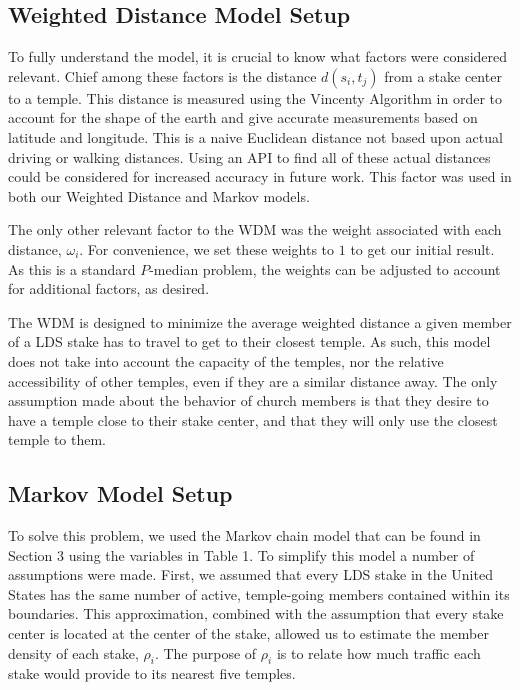 \documentclass[twoside,twocolumn]{article}
\begin{document}
\subsection{Weighted Distance Model Setup}

To fully understand the model, it is crucial to know what factors were considered relevant.
Chief among these factors is the distance $d(s_i,t_j)$ from a stake center to a temple. %
This distance is measured using the Vincenty Algorithm in order to account for the shape of the earth and give accurate measurements based on latitude and longitude. %
This is a naive Euclidean distance not based upon actual driving or walking distances.
Using an API to find all of these actual distances could be considered for increased accuracy in future work.
This factor was used in both our Weighted Distance and Markov models.

The only other relevant factor to the WDM was the weight associated with each distance, $\omega_i$. %
For convenience, we set these weights to $1$ to get our initial result.
As this is a standard $P$-median problem, the weights can be adjusted to account for additional factors, as desired.

The WDM is designed to minimize the average weighted distance a given member of a LDS stake has to travel to get to their closest temple.
As such, this model does not take into account the capacity of the temples, nor the relative accessibility of other temples, even if they are a similar distance away.
The only assumption made about the behavior of church members is that they desire to have a temple close to their stake center, and that they will only use the closest temple to them. %

\subsection{Markov Model Setup}

To solve this problem, we used the Markov chain model that can be found in Section 3 using the variables in Table 1.
To simplify this model a number of assumptions were made.
First, we assumed that every LDS stake in the United States has the same number of active, temple-going members contained within its boundaries.
This approximation, combined with the assumption that every stake center is located at the center of the stake, allowed us to estimate the member density of each stake, $\rho_i$.
The purpose of $\rho_{i}$ is to relate how much traffic each stake would provide to its nearest five temples. %
\end{document}
